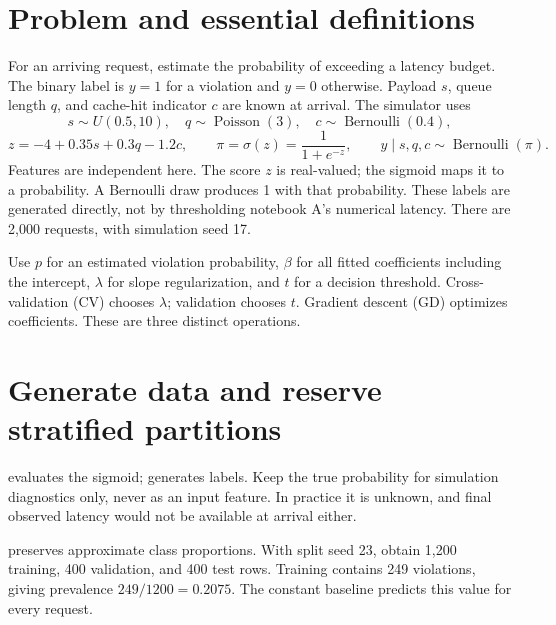 


\section*{Problem and essential definitions}
For an arriving request, estimate the probability of exceeding a latency budget. The binary label is $y=1$ for a violation and $y=0$ otherwise. Payload $s$, queue length $q$, and cache-hit indicator $c$ are known at arrival. The simulator uses
\[
s\sim U(0.5,10),\quad q\sim\operatorname{Poisson}(3),\quad
c\sim\operatorname{Bernoulli}(0.4),
\]
\[z=-4+0.35s+0.3q-1.2c,\qquad \pi=\sigma(z)=\frac1{1+e^{-z}},\qquad y\mid s,q,c\sim\operatorname{Bernoulli}(\pi).\]
Features are independent here. The score $z$ is real-valued; the sigmoid maps it to a probability. A Bernoulli draw produces 1 with that probability. These labels are generated directly, not by thresholding notebook A's numerical latency. There are 2,000 requests, with simulation seed 17.

Use $p$ for an estimated violation probability, $\beta$ for all fitted coefficients including the intercept, $\lambda$ for slope regularization, and $t$ for a decision threshold. Cross-validation (CV) chooses $\lambda$; validation chooses $t$. Gradient descent (GD) optimizes coefficients. These are three distinct operations.

\section{Generate data and reserve stratified partitions}
 evaluates the sigmoid;  generates labels. Keep the true probability for simulation diagnostics only, never as an input feature. In practice it is unknown, and final observed latency would not be available at arrival either.

 preserves approximate class proportions. With split seed 23, obtain 1,200 training, 400 validation, and 400 test rows. Training contains 249 violations, giving prevalence $249/1200=0.2075$. The constant baseline predicts this value for every request.

